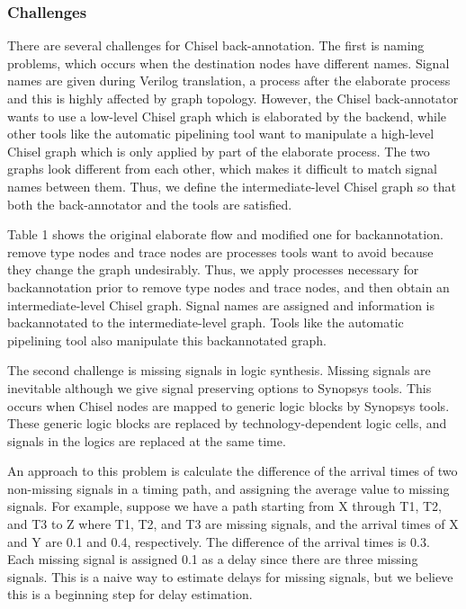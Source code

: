 \subsubsection{Challenges}
There are several challenges for Chisel back-annotation. The first is naming problems, which occurs when the destination nodes have different names. Signal names are given during Verilog translation, a process after the elaborate process and this is highly affected by graph topology. However, the Chisel back-annotator wants to use a low-level Chisel graph which is elaborated by the backend, while other tools like the automatic pipelining tool want to manipulate a high-level Chisel graph which is only applied by part of the elaborate process. The two graphs look different from each other, which makes it difficult to match signal names between them. Thus, we define the intermediate-level Chisel graph so that both the back-annotator and the tools are satisfied.

Table 1 shows the original elaborate flow and modified one for backannotation. remove type nodes and trace nodes are processes tools want to avoid because they change the graph undesirably. Thus, we apply processes necessary for backannotation prior to remove type nodes and trace nodes, and then obtain an intermediate-level Chisel graph. Signal names are assigned and information is backannotated to the intermediate-level graph. Tools like the automatic pipelining tool also manipulate this backannotated graph.

The second challenge is missing signals in logic synthesis. Missing signals are inevitable although we give signal preserving options to Synopsys tools. This occurs when Chisel nodes are mapped to generic logic blocks by Synopsys tools. These generic logic blocks are replaced by technology-dependent logic cells, and signals in the logics are replaced at the same time.

An approach to this problem is calculate the difference of the arrival times of two non-missing signals in a timing path, and assigning the average value to missing signals. For example, suppose we have a path starting from X through T1, T2, and T3 to Z where T1, T2, and T3 are missing signals, and the arrival times of X and Y are 0.1 and 0.4, respectively. The difference of the arrival times is 0.3.  Each missing signal is assigned 0.1 as a delay since there are three missing signals. This is a naive way to estimate delays for missing signals, but we believe this is a beginning step for delay estimation.

